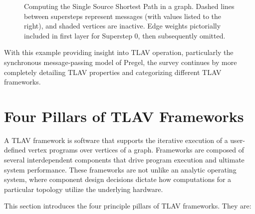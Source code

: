 \documentclass[reprint,twocolumn,showpacs,preprintnumbers,amsmath, aps,pre,amssymb]{revtex4-1}
\begin{document}
\begin{figure*}

\caption{Computing the Single Source Shortest Path in a graph.  Dashed lines between supersteps represent messages (with values listed to the right), and shaded vertices are inactive.  Edge weights pictorially included in first layer for Superstep 0, then subsequently omitted.} \label{fig:minval}
\end{figure*}

With this example providing insight into TLAV operation, particularly the synchronous message-passing model of Pregel, the survey continues by more completely detailing TLAV properties and categorizing different TLAV frameworks.

\section{Four Pillars of TLAV Frameworks}
\label{sec:sys_theory}

A TLAV framework is software that supports the iterative execution of a user-defined vertex programs over vertices of a graph.  Frameworks are composed of several interdependent components that drive program execution and ultimate system performance.  These frameworks are not unlike an analytic operating system, where component design decisions dictate how computations for a particular topology utilize the underlying hardware.

This section introduces the four principle pillars of TLAV frameworks.  They are:
\end{document}
